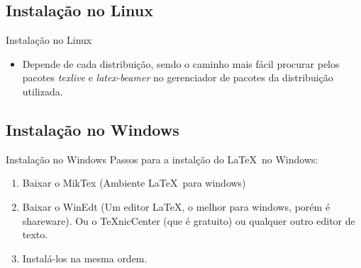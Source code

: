 \subsection{Instalação no Linux}

\begin{frame}{Instalação no Linux}
    \begin{itemize}
    \item Depende de cada distribuição, sendo o caminho mais fácil procurar pelos pacotes \textit{texlive} e \textit{latex-beamer} no gerenciador de pacotes da distribuição utilizada.
    \end{itemize}
\end{frame}

\subsection{Instalação no Windows}

\begin{frame}{Instalação no Windows}
    Passos para a instalção do \LaTeX\ no Windows:
    
    \begin{enumerate}
    \item Baixar o MikTex (Ambiente \LaTeX\ para windows)
    \item Baixar o WinEdt (Um editor \LaTeX, o melhor para windows, porém é shareware). Ou o TeXnicCenter (que é gratuito) ou qualquer outro editor de texto.
    \item Instalá-los na mesma ordem.
    \end{enumerate}
\end{frame}


